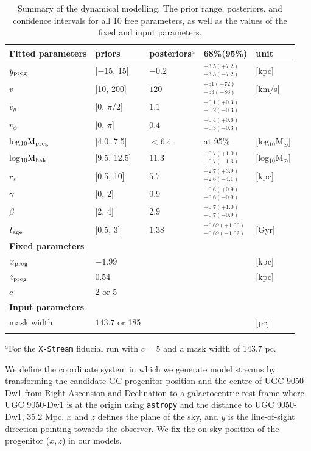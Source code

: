\documentclass[pdflatex,sn-mathphys-num]{sn-jnl}
\theoremstyle{thmstyleone}
\theoremstyle{thmstyletwo}
\theoremstyle{thmstylethree}
\begin{document}
\renewcommand{\tablename}{Extended Data Table}
\begin{table}[h]
\caption{Summary of the dynamical modelling. The prior range, posteriors, and confidence intervals for all 10 free parameters, as well as the values of the fixed and input parameters. }\label{tab:freeparams}
\begin{tabular}{@{}lllll@{}}
\toprule
 {\bf Fitted parameters}    & priors & posteriors$^a$ & 68\%(95\%)    & unit\\
\midrule
$y_{\rm prog}$ &   [$-15$, 15] & $-0.2$ &$^{+3.5(+7.2)}_{-3.3 (-7.2)}$ &   [kpc]   \\
$v$  & [10, 200] & $120$ &$^{+51(+72)}_{-53(-86)}$ & [km/s]\\
$v_{\theta}$  & [0, $\pi$/2] & $1.1$ &$^{+0.1(+0.3)}_{-0.2(-0.3)}$ &  \\
$v_{\phi}$&[0, $\pi$]& $0.4$ &$^{+0.4(+0.6)}_{-0.3(-0.3)}$ &\\
log$_{10}{\rm M}_{\rm prog}$&[4.0, 7.5] & $<6.4$ & at 95\% &[log$_{10}$M$_{\odot}$]\\
log$_{10}{\rm M}_{\rm halo}$&[9.5, 12.5]& $11.3$ &$^{+0.7(+1.0)}_{-0.7 (-1.3)}$ &[log$_{10}$M$_{\odot}$]\\
$r_s$   &  [0.5, 10]  & $5.7$ &$^{+2.7(+3.9)}_{-2.6(-4.1)}$ &[kpc]  \\
$\gamma$& [0, 2]&  0.9 & $^{+0.6(+0.9)}_{-0.6 (-0.9)}$ & \\
$\beta$ &[2, 4]& $2.9$ &$^{+0.7(+1.0)}_{-0.7(-0.9)}$ &  \\
$t_{\rm age}$ &  [0.5, 3]& $1.38$ &$^{+0.69(+1.00)}_{-0.69(-1.02)}$  &[Gyr]\\
\botrule
 {\bf  Fixed parameters }  &  & & \\
\midrule
$x_{\rm prog}$ & $-1.99$ & && [kpc]  \\
$z_{\rm prog}$ & 0.54 &&& [kpc]   \\
$c$ & 2 or 5 && \\
\botrule
 {\bf  Input parameters}  &&   & \\
\midrule
mask width  & $143.7$ or 185  &&  &[pc]  \\
\botrule
\end{tabular}
$^a$For the \texttt{X-Stream} fiducial run with $c=5$ and a mask width of 143.7 pc.
\end{table}

We define the coordinate system in which we generate model streams by transforming the candidate GC progenitor position and the centre of UGC 9050-Dw1 from Right Ascension and Declination to a galactocentric rest-frame where UGC 9050-Dw1 is at the origin using
\texttt{astropy} \citep{astropy2018} and the distance to UGC 9050-Dw1, 35.2 Mpc. $x$ and $z$ defines the plane of the sky, and $y$ is the line-of-sight direction pointing towards the observer. We fix the on-sky position of the progenitor ($x,z$) in our models.
\end{document}
